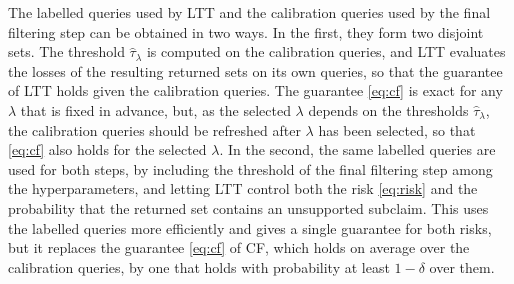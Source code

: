 The labelled queries used by LTT and the calibration queries used by the final filtering step can be obtained in two ways. In the first, they form two disjoint sets. The threshold $\hat{\tau}_{\lambda}$ is computed on the calibration queries, and LTT evaluates the losses of the resulting returned sets on its own queries, so that the guarantee of LTT holds given the calibration queries. The guarantee \eqref{eq:cf} is exact for any $\lambda$ that is fixed in advance, but, as the selected $\lambda$ depends on the thresholds $\hat{\tau}_{\lambda}$, the calibration queries should be refreshed after $\lambda$ has been selected, so that \eqref{eq:cf} also holds for the selected $\lambda$. In the second, the same labelled queries are used for both steps, by including the threshold of the final filtering step among the hyperparameters, and letting LTT control both the risk \eqref{eq:risk} and the probability that the returned set contains an unsupported subclaim. This uses the labelled queries more efficiently and gives a single guarantee for both risks, but it replaces the guarantee \eqref{eq:cf} of CF, which holds on average over the calibration queries, by one that holds with probability at least $1 - \delta$ over them. 


